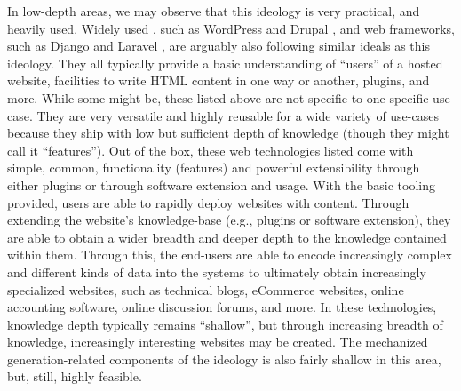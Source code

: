 In low-depth areas, we may observe that this ideology is very practical, and
heavily used. Widely used , such as WordPress \cite{WordPress} and
Drupal \cite{Drupal}, and web frameworks, such as Django \cite{Django} and
Laravel \cite{Laravel}, are arguably also following similar ideals as this
ideology. They all typically provide a basic understanding of ``users'' of a
hosted website, facilities to write HTML content in one way or another, plugins,
and more. While some might be, these listed above are not specific to one
specific use-case. They are very versatile and highly reusable for a wide
variety of use-cases because they ship with low but sufficient depth of
knowledge (though they might call it ``features''). Out of the box, these web
technologies listed come with simple, common, functionality (features) and
powerful extensibility through either plugins or through software extension and
usage. With the basic tooling provided, users are able to rapidly deploy
websites with content. Through extending the website's knowledge-base (e.g.,
plugins or software extension), they are able to obtain a wider breadth and
deeper depth to the knowledge contained within them. Through this, the end-users
are able to encode increasingly complex and different kinds of data into the
systems to ultimately obtain increasingly specialized websites, such as
technical blogs, eCommerce websites, online accounting software, online
discussion forums, and more. In these technologies, knowledge depth typically
remains ``shallow'', but through increasing breadth of knowledge, increasingly
interesting websites may be created. The mechanized generation-related
components of the ideology is also fairly shallow in this area, but, still,
highly feasible.





